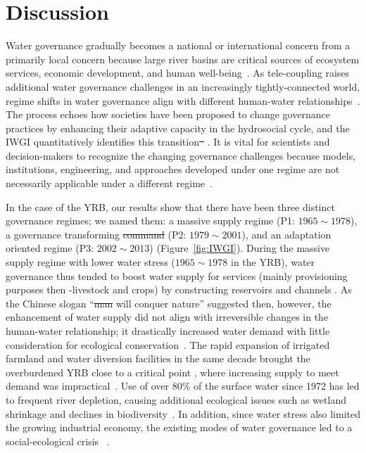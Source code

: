 \documentclass[draft]{../agujournal2019}
\providecommand{\DIFadd}[1]{{\protect\color{blue}\uwave{#1}}} %
\providecommand{\DIFdel}[1]{{\protect\color{red}\sout{#1}}}                      %
\providecommand{\DIFaddbegin}{} %
\providecommand{\DIFaddend}{} %
\providecommand{\DIFdelbegin}{} %
\providecommand{\DIFdelend}{} %
\begin{document}
\section{Discussion}\label{sec12}

Water governance gradually becomes a national or international concern from a primarily local concern because large river basins are critical sources of ecosystem services, economic development, and human well-being~\cite{best2019,best2020}.
As tele-coupling raises additional water governance challenges in an increasingly tightly-connected world, regime shifts in water governance align with different human-water relationships~\cite{diaz2019}.
The process echoes how societies have been proposed to change governance practices by enhancing their adaptive capacity in the hydrosocial cycle\DIFaddbegin \DIFadd{~}\cite{loch2020,turton1999}\DIFaddend , and the IWGI quantitatively identifies this transition\DIFdelbegin \DIFdel{~}%
\DIFdelend .
It is vital for scientists and decision-makers to recognize the changing governance challenges because models, institutions, engineering, and approaches developed under one regime are not necessarily applicable under a different regime~\cite{reyers2018}.

In the case of the YRB, our results show that there have been three distinct governance regimes; we named them: a massive supply regime (P1: $1965 \sim 1978$), a governance transforming \DIFdelbegin \DIFdel{command }\DIFdelend \DIFaddbegin \DIFadd{regime }\DIFaddend (P2: $1979 \sim 2001$), and an adaptation oriented regime (P3: $2002 \sim 2013$) (Figure~\ref{fig:IWGI}).
During the massive supply regime with lower water stress ($1965 \sim 1978$ in the YRB), water governance thus tended to boost water supply for services (mainly provisioning purposes then -livestock and crops) by constructing reservoirs and channels \DIFaddbegin \DIFadd{(Figure~\ref{fig:Causes}~B)}\DIFaddend .
As the Chinese slogan ``\DIFdelbegin \DIFdel{man }\DIFdelend \DIFaddbegin \DIFadd{human }\DIFaddend will conquer nature'' suggested then, however, the enhancement of water supply did not align with irreversible changes in the human-water relationship; it drastically increased water demand with little consideration for ecological conservation~\cite{zhou2020}.
The rapid expansion of irrigated farmland and water diversion facilities in the same decade brought the overburdened YRB close to a critical point \DIFaddbegin \DIFadd{(Figure~\ref{fig:Causes})}\DIFaddend , where increasing supply to meet demand was impractical~\cite{loch2020}.
Use of over $80\%$ of the surface water since 1972 has led to frequent river depletion, causing additional ecological issues such as wetland shrinkage and declines in biodiversity~\cite{wang2019c}.
In addition, since water stress also limited the growing industrial economy, the existing modes of water governance led to a social-ecological crisis~\DIFdelbegin %
\DIFdelend \DIFaddbegin \cite{wohlfart2016}\DIFaddend .
\end{document}
